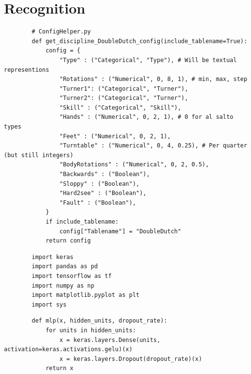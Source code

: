 \section{Recognition}
\label{sec:code-recognition}

\begin{listing}
    \begin{verbatim}
        # ConfigHelper.py
        def get_discipline_DoubleDutch_config(include_tablename=True):
            config = {
                "Type" : ("Categorical", "Type"), # Will be textual representions
                "Rotations" : ("Numerical", 0, 8, 1), # min, max, step
                "Turner1": ("Categorical", "Turner"),
                "Turner2": ("Categorical", "Turner"),
                "Skill" : ("Categorical", "Skill"),
                "Hands" : ("Numerical", 0, 2, 1), # 0 for al salto types
                "Feet" : ("Numerical", 0, 2, 1),
                "Turntable" : ("Numerical", 0, 4, 0.25), # Per quarter (but still integers)
                "BodyRotations" : ("Numerical", 0, 2, 0.5),
                "Backwards" : ("Boolean"),
                "Sloppy" : ("Boolean"),
                "Hard2see" : ("Boolean"),
                "Fault" : ("Boolean"),
            }
            if include_tablename:
                config["Tablename"] = "DoubleDutch"
            return config
    \end{verbatim}
    \caption[confighelper skill configuration]{ConfigHelper skill configuration for labeling aspects of a skill, devided in Categorical, Numerical and Boolean output values of skills. All values of the numerical output are integers, which is why you need to multiply by the step in order to get the actual numerical representation.}
    \label{code:confighelper}
\end{listing}

\begin{listing}
    \begin{verbatim}
        import keras
        import pandas as pd
        import tensorflow as tf
        import numpy as np
        import matplotlib.pyplot as plt
        import sys
    \end{verbatim}
    \caption[imports-ViViT]{imports-ViViT}
    \label{code:imports-ViViT}
\end{listing}


\begin{listing}
    \begin{verbatim}
        def mlp(x, hidden_units, dropout_rate):
            for units in hidden_units:
                x = keras.layers.Dense(units, activation=keras.activations.gelu)(x)
                x = keras.layers.Dropout(dropout_rate)(x)
            return x
    \end{verbatim}
    \caption[mlp layer]{ViViT: multi-layer-perceptron}
    \label{code:mlp-layer}
\end{listing}


